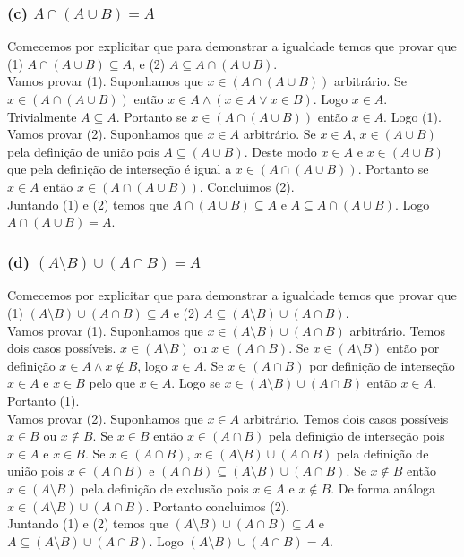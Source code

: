 \documentclass{article}
\begin{document}
\subsubsection*{(c) $A \cap (A \cup B) = A$}
Comecemos por explicitar que para demonstrar a igualdade temos que provar que (1) $A \cap (A \cup B) \subseteq A$, e (2) $A \subseteq A \cap (A \cup B)$.
\\[\baselineskip]
Vamos provar (1). Suponhamos que $x \in (A \cap (A \cup B))$ arbitrário. Se $x \in (A \cap (A \cup B))$ então $x \in A \wedge (x \in A \vee x \in B)$. Logo $x
  \in A$. Trivialmente $A \subseteq A$. Portanto se $x \in (A \cap (A \cup B))$ então $x \in A$. Logo (1).
\\[\baselineskip]
Vamos provar (2). Suponhamos que $x \in A$ arbitrário. Se $x \in A$, $x \in (A \cup B)$ pela definição de união pois $A \subseteq (A \cup B)$. Deste modo $x \in A$ e $x \in (A \cup B)$ que pela definição de interseção é igual a $x \in (A \cap (A \cup B))$. Portanto se $x \in A$ então $x \in (A \cap (A \cup B))$. Concluimos (2).
\\[\baselineskip]
Juntando (1) e (2) temos que $A \cap (A \cup B) \subseteq A$ e $A \subseteq A \cap (A \cup B)$. Logo $A \cap (A \cup B) = A$.

\subsubsection*{(d) $(A \setminus B) \cup (A \cap B) = A$}
Comecemos por explicitar que para demonstrar a igualdade temos que provar que (1) $(A \setminus B) \cup (A \cap B) \subseteq A$ e (2) $A \subseteq (A \setminus B) \cup (A \cap B)$.
\\[\baselineskip]
Vamos provar (1). Suponhamos que $x \in (A \setminus B) \cup (A \cap B)$ arbitrário. Temos dois casos possíveis. $x \in (A \setminus B)$ ou $x \in (A \cap B)$. Se $x \in (A \setminus B)$ então por definição $x \in A \wedge x \notin B$, logo $x \in A$. Se $x \in (A \cap B)$ por definição de interseção $x \in A$ e $x \in B$ pelo que $x \in A$. Logo se $x \in (A \setminus B) \cup (A \cap B)$ então $x \in A$. Portanto (1).
\\[\baselineskip]
Vamos provar (2). Suponhamos que $x \in A$ arbitrário. Temos dois casos possíveis $x \in B$ ou $x \notin B$. Se $x \in B$ então $x \in (A \cap B)$ pela definição de interseção pois $x \in A$ e $x \in B$. Se $x \in (A \cap B)$, $x \in (A \setminus B) \cup (A \cap B)$ pela definição de união pois $x \in (A \cap B)$ e $(A \cap B) \subseteq (A \setminus B) \cup (A \cap B)$. Se $x \notin B$ então $x \in (A \setminus B)$ pela definição de exclusão pois $x \in A$ e $x \notin B$. De forma análoga $x \in (A \setminus B) \cup (A \cap B)$. Portanto concluimos (2).
\\[\baselineskip]
Juntando (1) e (2) temos que $(A \setminus B) \cup (A \cap B) \subseteq A$ e $A \subseteq (A \setminus B) \cup (A \cap B)$. Logo $(A \setminus B) \cup (A \cap B) = A$.
\end{document}
